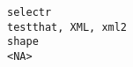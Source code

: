 \documentclass[
  letterpaper,
  DIV=11,
  numbers=noendperiod]{scrreprt}
\begin{document}
\begin{verbatim}
selectr                                                                                                                                                                                                                                                                                                                                                                                                                                                                                                                                                                                                                                                                                                                                                                                                                                                                                                                                                                                                                                                                                                                                                                                                                                                                                   testthat, XML, xml2
shape                                                                                                                                                                                                                                                                                                                                                                                                                                                                                                                                                                                                                                                                                                                                                                                                                                                                                                                                                                                                                                                                                                                                                                                                                                                                                                    <NA>

\end{verbatim}
\end{document}
